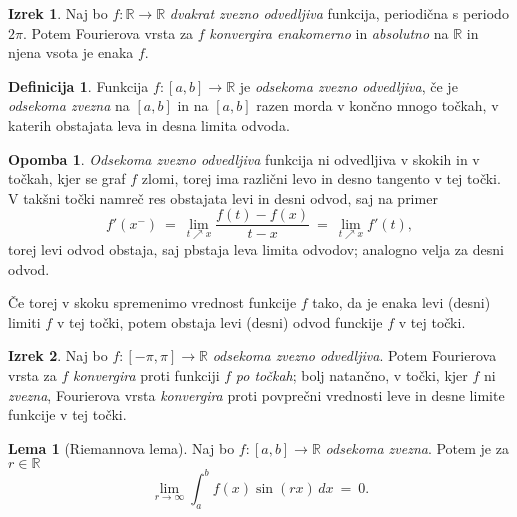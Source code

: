 \documentclass[11pt]{article}
\newcommand{\R}{\mathbb{R}}
\theoremstyle{definition}
\newtheorem{definicija}{Definicija}[section]
\theoremstyle{definition}
\theoremstyle{definition}
\newtheorem{izrek}{Izrek}[section]
\theoremstyle{theorem}
\newtheorem{lema}{Lema}
\newtheorem*{opomba}{Opomba}
\begin{document}
\begin{izrek}

Naj bo $f: \R \rightarrow \R$ \textit{dvakrat zvezno odvedljiva} funkcija, \hbox{periodična} s periodo $2\pi$. Potem Fourierova vrsta za $f$ \textit{konvergira enakomerno} in \textit{\hbox{absolutno}} na $\R$ in njena vsota je enaka $f$.

\end{izrek}
\vspace{0.5cm}

\begin{definicija}

Funkcija $f:[a, b] \rightarrow \mathbb{R}$ je \textit{odsekoma zvezno odvedljiva}, če je \textit{odsekoma zvezna} na $[a, b]$ in  na $[a, b]$ razen morda v končno mnogo točkah, v katerih obstajata leva in desna limita odvoda.

\end{definicija}
\vspace{0.5cm}

\begin{opomba}

\textit{Odsekoma zvezno odvedljiva} funkcija ni odvedljiva v skokih in v točkah, kjer se graf $f$ zlomi, torej ima različni levo in desno tangento v tej točki. V takšni točki namreč res obstajata levi in desni odvod, saj na primer 
$$f'(x^-) ~=~ \lim_{t \nearrow x} \frac{f(t) - f(x)}{t-x} ~=~ \lim_{t \nearrow x} f'(t),$$
torej levi odvod obstaja, saj pbstaja leva limita odvodov; analogno velja za desni odvod.

Če torej v skoku spremenimo vrednost funkcije $f$ tako, da je enaka levi (desni) limiti $f$ v tej točki, potem obstaja levi (desni) odvod funckije $f$ v tej točki.

\end{opomba}
\vspace{0.5cm}

\begin{izrek}

Naj bo $f: [-\pi, \pi] \rightarrow \R$ \textit{odsekoma zvezno odvedljiva}. Potem Fourierova vrsta za $f$ \textit{konvergira} proti funkciji $f$ \textit{po točkah}; bolj natančno, v točki, kjer $f$ ni \textit{zvezna}, Fourierova vrsta \textit{konvergira} proti povprečni vrednosti leve in desne limite funkcije v tej točki.

\end{izrek}
\vspace{0.5cm}

\begin{lema}[Riemannova lema]

Naj bo $f: [a, b] \rightarrow \R$ \textit{odsekoma zvezna}. Potem je za $r \in \R$
$$\lim_{r \rightarrow \infty} \int_a^b f(x) \sin(rx)\,dx ~=~ 0.$$

\end{lema}
\vspace{0.5cm}
\end{document}
